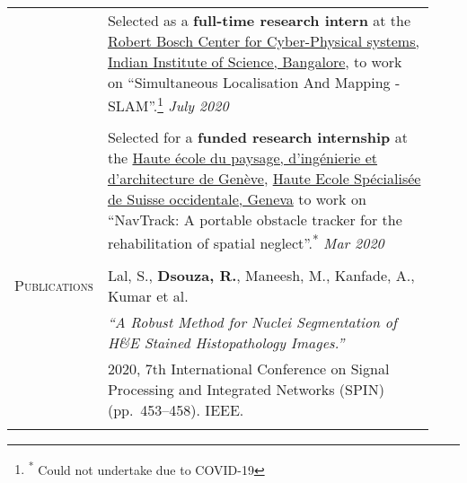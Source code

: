\documentclass[letterpaper, 10pt, oneside]{article}
\newcommand{\stitle}[1]{\normalsize{\textsc{#1}}}
\begin{document}
\begin{longtable}{@{} p{0.13\linewidth} p{0.8\linewidth}}
    & Selected as a \textbf{full-time research intern} at the
    \href{https://cps.iisc.ac.in/}{Robert Bosch Center for Cyber-Physical systems, Indian Institute of Science, Bangalore}, to work on
    ``Simultaneous Localisation And Mapping - SLAM''.\footnote[1]{\label{note1}\hspace{40em} \textsuperscript{*} Could not undertake due to COVID-19}
    \hfill \textsl{July 2020}                                                                                                     
    \\
    \\[-1.5ex]

                                                      & Selected for a \textbf{funded research internship}
    at the \href{https://www.hesge.ch/hepia/}{Haute école du paysage, d'ingénierie et d'architecture de Genève}, \href{https://www.hesge.ch/geneve}{Haute Ecole Spécialisée de Suisse occidentale, Geneva}
    to work on ``NavTrack: A portable obstacle tracker for the rehabilitation of spatial neglect''.\textsuperscript{*}         \hfill \textsl{Mar 2020}                                                                                                                      \\
    \\
    
    \stitle{Publications} & Lal, S., \textbf{Dsouza, R.}, Maneesh, M., Kanfade, A., Kumar et al. \\
                          & \textsl{``A Robust Method for Nuclei Segmentation of H\&E Stained Histopathology Images.''}                              \\
                          & 2020, 7th International Conference on Signal Processing and Integrated Networks (SPIN) (pp.~453--458)\@. IEEE\@.         \\
    \\
    


\end{longtable}
\end{document}
